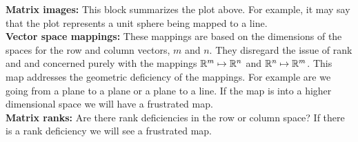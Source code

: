 \textbf{Matrix images:} This block summarizes the plot above. For example, it may say that the plot represents a unit sphere being mapped to a line.\\

\textbf{Vector space mappings:} These mappings are based on the dimensions of the spaces for the row and column vectors, $m$ and $n$. They disregard the issue of rank and and concerned purely with the mappings $\mathbb{R}^{m}\mapsto\mathbb{R}^{n}$ and  $\mathbb{R}^{n}\mapsto\mathbb{R}^{m}$. This map addresses the geometric deficiency of the mappings. For example are we going from a plane to a plane or a plane to a line. If the map is into a higher dimensional space we will have a frustrated map.\\

\textbf{Matrix ranks:} Are there rank deficiencies in the row or column space? If there is a rank deficiency we will see a frustrated map. 


\clearpage

